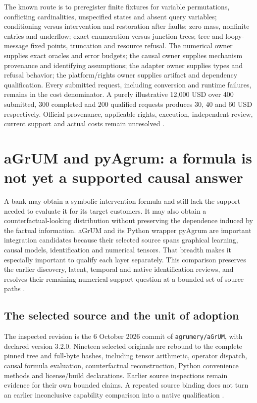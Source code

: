 The known route is to preregister finite fixtures for variable permutations,
conflicting cardinalities, unspecified states and absent query variables;
conditioning versus intervention and restoration after faults; zero mass,
nonfinite entries and underflow; exact enumeration versus junction trees;
tree and loopy-message fixed points, truncation and resource refusal.
The numerical owner supplies exact oracles and error budgets; the causal
owner supplies mechanism provenance and identifying assumptions; the
adapter owner supplies types and refusal behavior; the platform/rights owner
supplies artifact and dependency qualification. Every submitted request,
including conversion and runtime failures, remains in the cost denominator.
A purely illustrative 12,000 USD over 400 submitted, 300 completed and
200 qualified requests produces 30, 40 and 60 USD respectively.
Official provenance, applicable rights, execution, independent review, current support and actual costs remain unresolved \citep{exec24_libdai_choice}.


\section{aGrUM and pyAgrum: a formula is not yet a supported causal answer}
\label{sec:exec24-agrum-reuse}

A bank may obtain a symbolic intervention formula and still lack the support
needed to evaluate it for its target customers. It may also obtain a
counterfactual-looking distribution without preserving the dependence induced
by the factual information. aGrUM and its Python wrapper pyAgrum are important
integration candidates because their selected source spans graphical
learning, causal models, identification and numerical tensors. That breadth
makes it especially important to qualify each layer separately. This
comparison preserves the earlier discovery, latent, temporal and native
identification reviews, and resolves their remaining numerical-support
question at a bounded set of source paths
\citep{exec13_cxx_agrum,exec14_native_agrum,exec16_ct_agrum,
exec19_cxx_identification_source,exec24_agrum_source}.

\subsection{The selected source and the unit of adoption}
The inspected revision is the 6 October 2026 commit of
\texttt{agrumery/aGrUM}, with declared version 3.2.0. Nineteen selected
originals are rebound to the complete pinned tree and full-byte hashes,
including tensor arithmetic, operator dispatch, causal formula evaluation,
counterfactual reconstruction, Python convenience methods and license/build
declarations. Earlier source inspections remain evidence for their own
bounded claims. A repeated source binding does not turn an earlier
inconclusive capability comparison into a native qualification
\citep{exec24_agrum_source,exec24_agrum_choice}.

